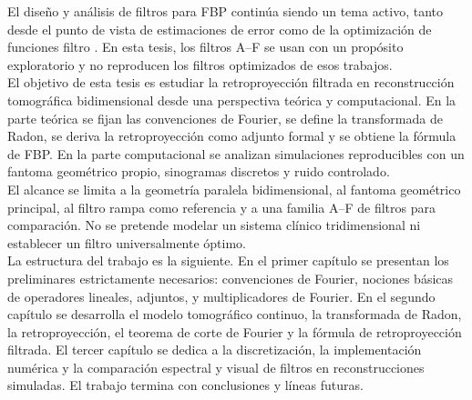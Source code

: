 El diseño y análisis de filtros para FBP continúa siendo un tema activo, tanto desde el punto de vista de estimaciones de error como de la optimización de funciones filtro \cite{beckmann_iske2017,beckmann_nickel2025}. En esta tesis, los filtros A--F se usan con un propósito exploratorio y no reproducen los filtros optimizados de esos trabajos.\\

El objetivo de esta tesis es estudiar la retroproyección filtrada en reconstrucción tomográfica bidimensional desde una perspectiva teórica y computacional. En la parte teórica se fijan las convenciones de Fourier, se define la transformada de Radon, se deriva la retroproyección como adjunto formal y se obtiene la fórmula de FBP. En la parte computacional se analizan simulaciones reproducibles con un fantoma geométrico propio, sinogramas discretos y ruido controlado.\\

El alcance se limita a la geometría paralela bidimensional, al fantoma geométrico principal, al filtro rampa como referencia y a una familia A--F de filtros para comparación. No se pretende modelar un sistema clínico tridimensional ni establecer un filtro universalmente óptimo.\\

La estructura del trabajo es la siguiente. En el primer capítulo se presentan los preliminares estrictamente necesarios: convenciones de Fourier, nociones básicas de operadores lineales, adjuntos, y multiplicadores de Fourier. En el segundo capítulo se desarrolla el modelo tomográfico continuo, la transformada de Radon, la retroproyección, el teorema de corte de Fourier y la fórmula de retroproyección filtrada. El tercer capítulo se dedica a la discretización, la implementación numérica y la comparación espectral y visual de filtros en reconstrucciones simuladas. El trabajo termina con conclusiones y líneas futuras.
